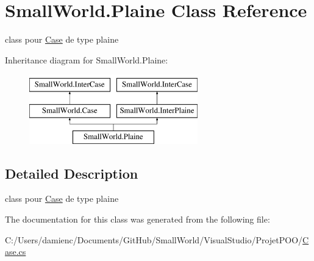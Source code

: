 \hypertarget{class_small_world_1_1_plaine}{\section{Small\-World.\-Plaine Class Reference}
\label{class_small_world_1_1_plaine}
}


class pour \hyperlink{class_small_world_1_1_case}{Case} de type plaine  


Inheritance diagram for Small\-World.\-Plaine\-:\begin{figure}[H]
\begin{center}
\leavevmode
\includegraphics[height=3.000000cm]{class_small_world_1_1_plaine}
\end{center}
\end{figure}


\subsection{Detailed Description}
class pour \hyperlink{class_small_world_1_1_case}{Case} de type plaine 

The documentation for this class was generated from the following file\-:\begin{DoxyCompactItemize}
\item 
C\-:/\-Users/damienc/\-Documents/\-Git\-Hub/\-Small\-World/\-Visual\-Studio/\-Projet\-P\-O\-O/\hyperlink{_case_8cs}{Case.\-cs}\end{DoxyCompactItemize}
